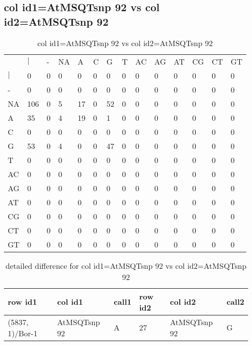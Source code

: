 \subsection{col id1=AtMSQTsnp 92 vs col id2=AtMSQTsnp 92}
\begin{center}
\begin{longtable}{|l|l|l|l|l|l|l|l|l|l|l|l|l|l|}
\caption{col id1=AtMSQTsnp 92 vs col id2=AtMSQTsnp 92} \label{table_dm982}\\
\hline
\\
\hline
&$|$&-&NA&A&C&G&T&AC&AG&AT&CG&CT&GT\\
$|$&0&0&0&0&0&0&0&0&0&0&0&0&0\\
-&0&0&0&0&0&0&0&0&0&0&0&0&0\\
NA&106&0&5&17&0&52&0&0&0&0&0&0&0\\
A&35&0&4&19&0&1&0&0&0&0&0&0&0\\
C&0&0&0&0&0&0&0&0&0&0&0&0&0\\
G&53&0&4&0&0&47&0&0&0&0&0&0&0\\
T&0&0&0&0&0&0&0&0&0&0&0&0&0\\
AC&0&0&0&0&0&0&0&0&0&0&0&0&0\\
AG&0&0&0&0&0&0&0&0&0&0&0&0&0\\
AT&0&0&0&0&0&0&0&0&0&0&0&0&0\\
CG&0&0&0&0&0&0&0&0&0&0&0&0&0\\
CT&0&0&0&0&0&0&0&0&0&0&0&0&0\\
GT&0&0&0&0&0&0&0&0&0&0&0&0&0\\
\hline
\end{longtable}
\end{center}

\begin{center}
\begin{longtable}{|l|l|l|l|l|l|}
\caption{detailed difference for col id1=AtMSQTsnp 92 vs col id2=AtMSQTsnp 92} \label{table_dm983}\\
\hline
row id1&col id1&call1&row id2&col id2&call2\\
\hline
(5837, 1)/Bor-1&AtMSQTsnp 92&A&27&AtMSQTsnp 92&G\\
\hline
\end{longtable}
\end{center}

